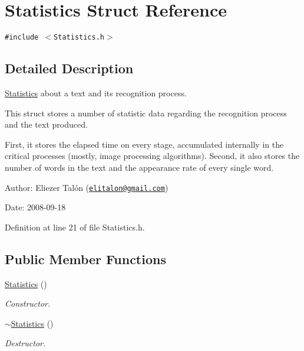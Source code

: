 \hypertarget{struct_statistics}{
\section{Statistics Struct Reference}
\label{struct_statistics}
}
{\tt \#include $<$Statistics.h$>$}



\subsection{Detailed Description}
\hyperlink{struct_statistics}{Statistics} about a text and its recognition process. 

This struct stores a number of statistic data regarding the recognition process and the text produced.

First, it stores the elapsed time on every stage, accumulated internally in the critical processes (mostly, image processing algorithms). Second, it also stores the number of words in the text and the appearance rate of every single word.

\begin{Desc}
\item[Author:]Eliezer Talón (\href{mailto:elitalon@gmail.com}{\tt elitalon@gmail.com}) \end{Desc}
\begin{Desc}
\item[Date:]2008-09-18 \end{Desc}


Definition at line 21 of file Statistics.h.\subsection*{Public Member Functions}
\begin{CompactItemize}
\item 
\hyperlink{struct_statistics_60ddd90a571ed4c3ce8c0f6317a36d63}{Statistics} ()
\begin{CompactList}\small\item\em Constructor. \item\end{CompactList}\item 
\hyperlink{struct_statistics_b68ede75479e44d5c35b78ec1284065b}{$\sim$Statistics} ()
\begin{CompactList}\small\item\em Destructor. \item\end{CompactList}\end{CompactItemize}
